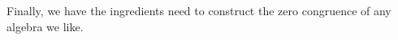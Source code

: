 \ccpad
Finally, we have the ingredients need to construct the zero congruence of any algebra we like.
\ccpad
\begin{code}%
\>[0]\AgdaSpace{}%
\AgdaSymbol{:}\AgdaSpace{}%
\AgdaSymbol{\{}\AgdaSpace{}%
\AgdaSymbol{:}\AgdaSpace{}%
\AgdaSymbol{\}}\AgdaSpace{}%
\AgdaSpace{}%
\AgdaSpace{}%
\AgdaSpace{}%
\AgdaSpace{}%
\AgdaSpace{}%
\AgdaSymbol{\{}\AgdaSpace{}%
\AgdaSymbol{:}\AgdaSpace{}%
\AgdaSpace{}%
\AgdaSpace{}%
\AgdaSymbol{\}}\AgdaSpace{}%
\AgdaSpace{}%
\AgdaSpace{}%
\<%
\\
\>[0]\AgdaSpace{}%
\AgdaSpace{}%
\AgdaSymbol{=}\AgdaSpace{}%
\AgdaSpace{}%
\AgdaSpace{}%
\AgdaSymbol{(}\AgdaSpace{}%
\AgdaSymbol{)}\AgdaSpace{}%
\<%
\end{code}

